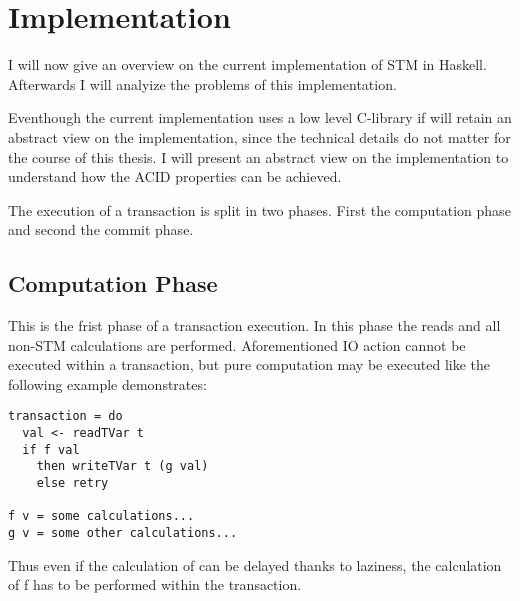   
\section{Implementation}
I will now give an overview on the current implementation of STM in Haskell. Afterwards I will analyize the problems of this implementation.

Eventhough the current implementation uses a low level C-library if will retain an abstract view on the implementation, since the technical 
details do not matter for the course of this thesis. I will present an abstract view on the implementation to understand how the ACID 
properties can be achieved.

The execution of a transaction is split in two phases. First the computation phase and second the commit phase. 

\subsection{Computation Phase}
This is the frist phase of a transaction execution. In this phase the reads and all non-STM calculations are performed. 
Aforementioned IO action cannot be executed within a transaction, but pure computation may be executed like the following
example demonstrates:
\begin{lstlisting}
transaction = do 
  val <- readTVar t
  if f val 
    then writeTVar t (g val)
    else retry

f v = some calculations...    
g v = some other calculations...
\end{lstlisting}
Thus even if the calculation of  can be delayed thanks to laziness, the calculation of f has to be performed within the transaction.

